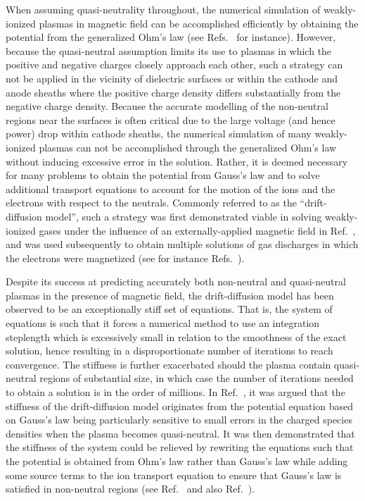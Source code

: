 \documentclass[twoside,onecolumn,10pt]{waflarticle}
\begin{document}
When assuming quasi-neutrality throughout, the numerical simulation of weakly-ionized plasmas in magnetic field can be accomplished efficiently by obtaining the potential from the generalized Ohm's law (see Refs.\ \cite{aiaa:2009:wan, jpp:2007:parent} for instance). However, because the quasi-neutral assumption limits its use to plasmas in which the positive and negative charges closely approach each other, such a strategy can not be applied in the vicinity of dielectric surfaces or within the cathode and anode sheaths where the positive charge density differs substantially from the negative charge density. Because the accurate modelling of the non-neutral regions near the surfaces is often critical due to the large voltage (and hence power) drop within cathode sheaths, the numerical simulation of many weakly-ionized plasmas can not be accomplished through the generalized Ohm's law  without inducing excessive error in the solution. Rather, it is deemed necessary for many problems to obtain the potential from Gauss's law and to solve additional transport equations to account for the motion of the ions and the electrons with respect to the neutrals. Commonly referred to as the  ``drift-diffusion model'', such a strategy was first demonstrated viable in solving weakly-ionized gases under the influence of an externally-applied magnetic field in Ref.\ \cite{jcp:2004:surzhikov}, and was used subsequently to obtain multiple solutions of gas discharges in which the electrons were magnetized (see for instance Refs.\ \cite{jpp:2008:poggie,jap:2009:shang,bookchapter:2009:shang}).


Despite its success at predicting accurately both non-neutral and quasi-neutral plasmas in the presence of magnetic field, the drift-diffusion model has been observed to be an exceptionally stiff set of equations. That is, the system of equations is such that it forces a numerical method to use an integration steplength which is excessively small in relation to the smoothness of the exact solution, hence resulting in a disproportionate number of iterations to reach convergence. The stiffness is further exacerbated should the plasma contain quasi-neutral regions of substantial size, in which case the number of iterations needed to obtain a solution is in the order of millions. In Ref.\ \cite{jcp:2013:parent}, it was argued that the stiffness of the drift-diffusion model originates from the potential equation based on Gauss's law being particularly sensitive to small errors in the charged species densities when the plasma becomes quasi-neutral. It was then demonstrated that the stiffness of the system could be relieved by rewriting the equations such that the potential is obtained from Ohm's law rather than Gauss's law while adding some source terms to the ion transport equation to ensure that Gauss's law is satisfied in non-neutral regions (see Ref.\ \cite{jcp:2013:parent} and also Ref.\ \cite{jcp:2007:crispel}). 
\end{document}
